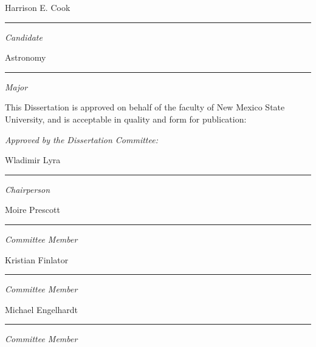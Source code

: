 \begin{flushleft}
{\normalsize Harrison E. Cook}
\vspace{3pt}
\hrule
\emph{\large Candidate}


{\normalsize Astronomy}
\vspace{3pt}
\hrule
\emph{\large Major}

\bigskip
\begin{singlespace}
{\normalsize This Dissertation is approved on behalf of the faculty of New Mexico State University, and is acceptable in quality and form for publication:}
\end{singlespace}

\emph{\large Approved by the Dissertation Committee:}

{\normalsize Wladimir Lyra}
\vspace{3pt}
\hrule
\emph{ \large Chairperson}

\vspace{0.2in}

\normalsize{Moire Prescott}
\vspace{3pt}
\hrule
\emph{ \large Committee Member}

\vspace{0.2in}

\normalsize{Kristian Finlator}
\vspace{3pt}
\hrule
\emph{\large Committee Member}

\vspace{0.2in}

\normalsize{Michael Engelhardt}
\vspace{3pt}
\hrule
\emph{ \large Committee Member}

\vspace{0.2in}


\end{flushleft}

